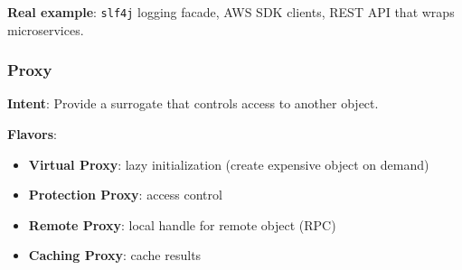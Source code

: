 \documentclass[11pt]{article}
\providecommand{\tightlist}{\setlength{\itemsep}{1pt}\setlength{\parskip}{0pt}}
\begin{document}
\textbf{Real example}: \texttt{slf4j} logging facade, AWS SDK clients, REST API that wraps microservices.

\subsubsection{Proxy}\label{proxy}

\textbf{Intent}: Provide a surrogate that controls access to another object.

\textbf{Flavors}:

\begin{itemize}
\tightlist
\item
  \textbf{Virtual Proxy}: lazy initialization (create expensive object on demand)
\item
  \textbf{Protection Proxy}: access control
\item
  \textbf{Remote Proxy}: local handle for remote object (RPC)
\item
  \textbf{Caching Proxy}: cache results
\end{itemize}

\end{document}

